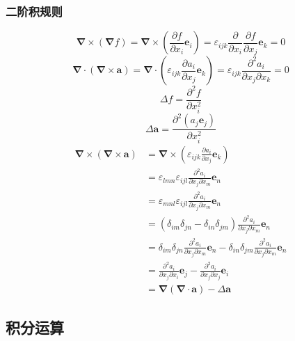 \subsubsection{二阶积规则}
\begin{equation}
    \boldsymbol{\nabla}\times(\boldsymbol{\nabla}f)=\boldsymbol{\nabla}\times(\frac{\partial f}{\partial x_i}\boldsymbol{e}_i)=\varepsilon_{ijk}\frac{\partial}{\partial x_i}\frac{\partial f}{\partial x_j}\boldsymbol{e}_k=0
\end{equation}
\begin{equation}
    \boldsymbol{\nabla}\cdot(\boldsymbol{\nabla}\times \boldsymbol{a})=\boldsymbol{\nabla}\cdot(\varepsilon_{ijk}\frac{\partial a_i}{\partial x_j}\boldsymbol{e}_k)=\varepsilon_{ijk}\frac{\partial^2 a_i}{\partial x_j\partial x_k}=0
\end{equation}
\begin{equation}
    \Delta f=\frac{\partial^2 f}{\partial x_i^2}
\end{equation}
\begin{equation}
    \Delta \boldsymbol{a}=\frac{\partial^2 (a_j\boldsymbol{e}_j)}{\partial x_i^2}
\end{equation}
\begin{align}
    \boldsymbol{\nabla}\times(\boldsymbol{\nabla}\times \boldsymbol{a})&=\boldsymbol{\nabla}\times(\varepsilon_{ijk}\frac{\partial a_i}{\partial x_j}\boldsymbol{e}_k)\nonumber\\
    &=\varepsilon_{lmn}\varepsilon_{ijl}\frac{\partial^2 a_i}{\partial x_j\partial x_m}\boldsymbol{e}_n\nonumber\\
    &=\varepsilon_{mnl}\varepsilon_{ijl}\frac{\partial^2 a_i}{\partial x_j\partial x_m}\boldsymbol{e}_n\nonumber\\
    &=(\delta_{im}\delta_{jn}-\delta_{in}\delta_{jm})\frac{\partial^2 a_i}{\partial x_j\partial x_m}\boldsymbol{e}_n\nonumber\\
    &=\delta_{im}\delta_{jn}\frac{\partial^2 a_i}{\partial x_j\partial x_m}\boldsymbol{e}_n\nonumber-\delta_{in}\delta_{jm}\frac{\partial^2 a_i}{\partial x_j\partial x_m}\boldsymbol{e}_n\nonumber\\
    &=\frac{\partial^2 a_i}{\partial x_j\partial x_i}\boldsymbol{e}_j\nonumber-\frac{\partial^2 a_i}{\partial x_j\partial x_j}\boldsymbol{e}_i\nonumber\\
    &=\boldsymbol{\nabla}(\boldsymbol{\nabla}\cdot\boldsymbol{a})-\Delta \boldsymbol{a}
\end{align}
\subsection{积分运算}
